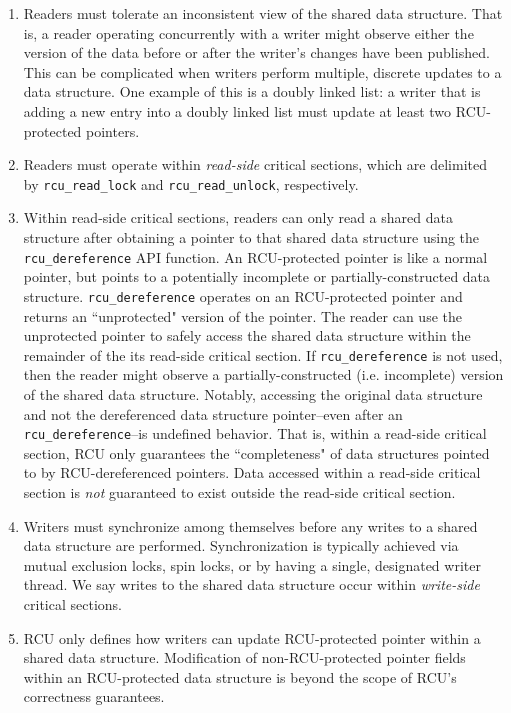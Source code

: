 \documentclass[preprint]{sigplanconf}
\begin{document}
\begin{enumerate}
	\item Readers must tolerate an inconsistent view of the shared data structure. That is, a reader operating concurrently with a writer might observe either the version of the data before or after the writer's changes have been published. This can be complicated when writers perform multiple, discrete updates to a data structure. One example of this is a doubly linked list: a writer that is adding a new entry into a doubly linked list must update at least two RCU-protected pointers.
	
	\item Readers must operate within \emph{read-side} critical sections, which are delimited by \texttt{rcu\_read\_lock} and \texttt{rcu\_read\_unlock}, respectively.
	
	\item Within read-side critical sections, readers can only read a shared data structure after obtaining a pointer to that shared data structure using the \texttt{rcu\_dereference} API function. An RCU-protected pointer is like a normal pointer, but points to a potentially incomplete or partially-constructed data structure. \texttt{rcu\_dereference} operates on an RCU-protected pointer and returns an ``unprotected" version of the pointer. The reader can use the unprotected pointer to safely access the shared data structure within the remainder of the its read-side critical section. If \texttt{rcu\_dereference} is not used, then the reader might observe a partially-constructed (i.e. incomplete) version of the shared data structure. Notably, accessing the original data structure and not the dereferenced data structure pointer--even after an \texttt{rcu\_dereference}--is undefined behavior. That is, within a read-side critical section, RCU only guarantees the ``completeness" of data structures pointed to by RCU-dereferenced pointers. Data accessed within a read-side critical section is \emph{not} guaranteed to exist outside the read-side critical section.

	\item Writers must synchronize among themselves before any writes to a shared data structure are performed. Synchronization is typically achieved via mutual exclusion locks, spin locks, or by having a single, designated writer thread. We say writes to the shared data structure occur within \emph{write-side} critical sections.

	\item RCU only defines how writers can update RCU-protected pointer within a shared data structure. Modification of non-RCU-protected pointer fields within an RCU-protected data structure is beyond the scope of RCU's correctness guarantees.


\end{enumerate}
\end{document}
